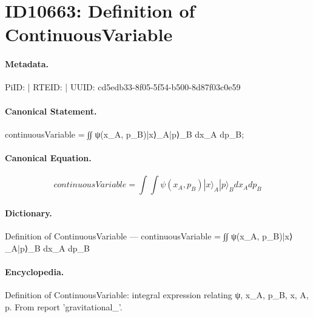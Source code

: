 \section*{ID10663: Definition of ContinuousVariable}
\paragraph{Metadata.}
PiID:  | RTEID:  | UUID: cd5edb33-8f05-5f54-b500-8d87f03c0e59

\paragraph{Canonical Statement.}
continuousVariable = ∫∫ ψ(x\_A, p\_B)|x⟩\_A|p⟩\_B dx\_A dp\_B;

\paragraph{Canonical Equation.}
\[
continuousVariable = ∫∫ ψ(x_A, p_B)|x⟩_A|p⟩_B dx_A dp_B
\]

\paragraph{Dictionary.}
Definition of ContinuousVariable — continuousVariable = ∫∫ ψ(x\_A, p\_B)|x⟩\_A|p⟩\_B dx\_A dp\_B

\paragraph{Encyclopedia.}
Definition of ContinuousVariable: integral expression relating ψ, x\_A, p\_B, x, A, p. From report 'gravitational\_'.
